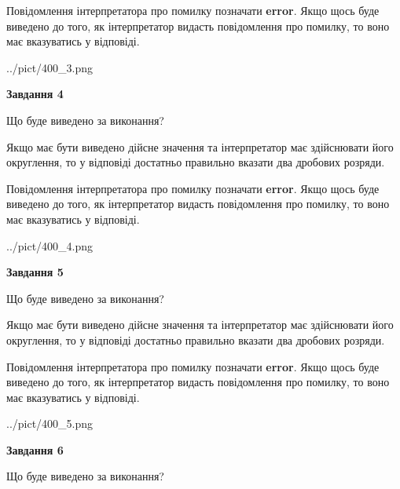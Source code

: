 \documentclass[12pt, ukrainian]{article}
\begin{document}
{\begin {Large}
Повідомлення інтерпретатора про помилку позначати \textbf{error}.
Якщо щось буде виведено до того, як інтерпретатор видасть повідомлення про помилку, 
то воно має вказуватись у відповіді. \par

\begin{center}
	{../pict/400_3.png}
\end{center}
\newpage

{\begin {center}\textbf{Завдання 4}\end {center}}\par
Що буде виведено за виконання? \par

Якщо має бути виведено дійсне значення та інтерпретатор має здійснювати його округлення, 
то у відповіді достатньо правильно вказати два дробових розряди.

Повідомлення інтерпретатора про помилку позначати \textbf{error}.
Якщо щось буде виведено до того, як інтерпретатор видасть повідомлення про помилку, 
то воно має вказуватись у відповіді. \par

\begin{center}
	{../pict/400_4.png}
\end{center}
\newpage

{\begin {center}\textbf{Завдання 5}\end {center}}\par
Що буде виведено за виконання? \par

Якщо має бути виведено дійсне значення та інтерпретатор має здійснювати його округлення, 
то у відповіді достатньо правильно вказати два дробових розряди.

Повідомлення інтерпретатора про помилку позначати \textbf{error}.
Якщо щось буде виведено до того, як інтерпретатор видасть повідомлення про помилку, 
то воно має вказуватись у відповіді. \par

\begin{center}
	{../pict/400_5.png}
\end{center}
\newpage

{\begin {center}\textbf{Завдання 6}\end {center}}\par
Що буде виведено за виконання? \par


\end{Large}}
\end{document}
